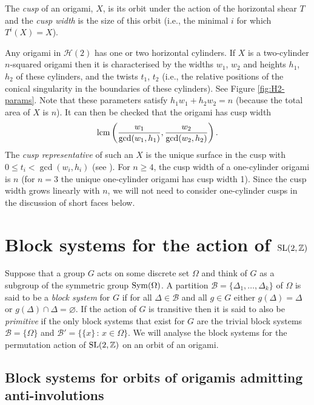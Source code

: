 \documentclass[a4paper,11pt]{amsart}
\numberwithin{equation}{section}
\numberwithin{figure}{section}
\numberwithin{table}{section}
\newcommand{\calH}{\mathcal{H}}
\newcommand{\Z}{\mathbb{Z}}
\newcommand{\cuspwidth}{{\rm{lcm}}\left(\frac{w_{1}}{\gcd(w_{1},h_{1})},\frac{w_{2}}{\gcd(w_{2},h_{2})}\right)}
\DeclareMathOperator{\SL}{{\rm{SL}}}
\DeclareMathOperator{\Sym}{{\rm{Sym}}}
\begin{document}
The \emph{cusp} of an origami, $X$, is its orbit under the action of the horizontal shear $T$ and the \emph{cusp width} is the size of this orbit (i.e., the minimal $i$ for which $T^{i}(X) = X$).

Any origami in $\calH(2)$ has one or two horizontal cylinders. If $X$ is a two-cylinder $n$-squared origami then it is characterised by the widths $w_1$, $w_2$ and heights $h_1$, $h_2$ of these cylinders, and the twists $t_1$, $t_2$ (i.e., the relative positions of the conical singularity in the boundaries of these cylinders). See Figure \ref{fig:H2-params}. Note that these parameters satisfy $h_1w_1+h_2w_2=n$ (because the total area of $X$ is $n$). It can then be checked that the origami has cusp width
\[\cuspwidth.\]
The \textit{cusp representative} of such an $X$ is the unique surface in the cusp with $0\leq t_{i} < \gcd(w_{i},h_{i})$ (see \cite[Lemma 3.1]{HL}).
For $n\geq 4$, the cusp width of a one-cylinder origami is $n$ (for $n = 3$ the unique one-cylinder origami has cusp width 1). Since the cusp width grows linearly with $n$, we will not need to consider one-cylinder cusps in the discussion of short faces below.


\section{Block systems for the action of $\SL(2,\Z)$}\label{sec:blocks}

Suppose that a group $G$ acts on some discrete set $\Omega$ and think of $G$ as a subgroup of the symmetric group $\Sym(\Omega)$. A partition $\mathscr{B} = \{\Delta_{1},\ldots,\Delta_{k}\}$ of $\Omega$ is said to be a \emph{block system} for $G$ if for all $\Delta\in \mathscr{B}$ and all $g\in G$ either $g(\Delta) = \Delta$ or $g(\Delta)\cap\Delta=\varnothing$. If the action of $G$ is transitive then it is said to also be \emph{primitive} if the only block systems that exist for $G$ are the trivial block systems $\mathscr{B} = \{\Omega\}$ and $\mathscr{B}' = \{\{x\}\,:\,x\in\Omega\}$. We will analyse the block systems for the permutation action of $\SL(2,\Z)$ on an orbit of an origami.


\subsection{Block systems for orbits of origamis admitting anti-involutions}
\end{document}
